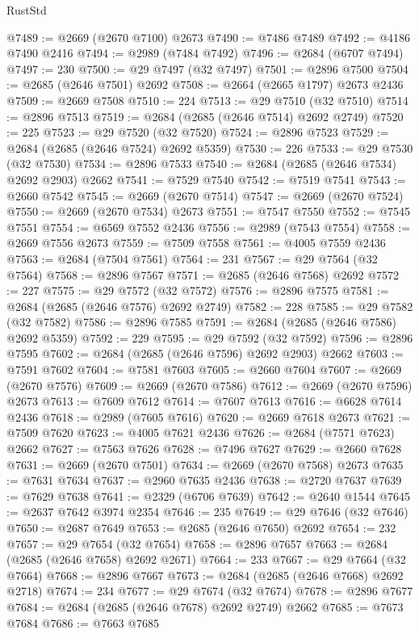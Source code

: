 \begin{lexlean}{RustStd}
\begin{coremodule}
@7489 := @2669 (@2670 @7100) @2673
@7490 := @7486 @7489
@7492 := @4186 @7490 @2416
@7494 := @2989 (@7484 @7492)
@7496 := @2684 (@6707 @7494)
@7497 := 230
@7500 := @29 @7497 (@32 @7497)
@7501 := @2896 @7500
@7504 := @2685 (@2646 @7501) @2692
@7508 := @2664 (@2665 @1797) @2673 @2436
@7509 := @2669 @7508
@7510 := 224
@7513 := @29 @7510 (@32 @7510)
@7514 := @2896 @7513
@7519 := @2684 (@2685 (@2646 @7514) @2692 @2749)
@7520 := 225
@7523 := @29 @7520 (@32 @7520)
@7524 := @2896 @7523
@7529 := @2684 (@2685 (@2646 @7524) @2692 @5359)
@7530 := 226
@7533 := @29 @7530 (@32 @7530)
@7534 := @2896 @7533
@7540 := @2684 (@2685 (@2646 @7534) @2692 @2903) @2662
@7541 := @7529 @7540
@7542 := @7519 @7541
@7543 := @2660 @7542
@7545 := @2669 (@2670 @7514)
@7547 := @2669 (@2670 @7524)
@7550 := @2669 (@2670 @7534) @2673
@7551 := @7547 @7550
@7552 := @7545 @7551
@7554 := @6569 @7552 @2436
@7556 := @2989 (@7543 @7554)
@7558 := @2669 @7556 @2673
@7559 := @7509 @7558
@7561 := @4005 @7559 @2436
@7563 := @2684 (@7504 @7561)
@7564 := 231
@7567 := @29 @7564 (@32 @7564)
@7568 := @2896 @7567
@7571 := @2685 (@2646 @7568) @2692
@7572 := 227
@7575 := @29 @7572 (@32 @7572)
@7576 := @2896 @7575
@7581 := @2684 (@2685 (@2646 @7576) @2692 @2749)
@7582 := 228
@7585 := @29 @7582 (@32 @7582)
@7586 := @2896 @7585
@7591 := @2684 (@2685 (@2646 @7586) @2692 @5359)
@7592 := 229
@7595 := @29 @7592 (@32 @7592)
@7596 := @2896 @7595
@7602 := @2684 (@2685 (@2646 @7596) @2692 @2903) @2662
@7603 := @7591 @7602
@7604 := @7581 @7603
@7605 := @2660 @7604
@7607 := @2669 (@2670 @7576)
@7609 := @2669 (@2670 @7586)
@7612 := @2669 (@2670 @7596) @2673
@7613 := @7609 @7612
@7614 := @7607 @7613
@7616 := @6628 @7614 @2436
@7618 := @2989 (@7605 @7616)
@7620 := @2669 @7618 @2673
@7621 := @7509 @7620
@7623 := @4005 @7621 @2436
@7626 := @2684 (@7571 @7623) @2662
@7627 := @7563 @7626
@7628 := @7496 @7627
@7629 := @2660 @7628
@7631 := @2669 (@2670 @7501)
@7634 := @2669 (@2670 @7568) @2673
@7635 := @7631 @7634
@7637 := @2960 @7635 @2436
@7638 := @2720 @7637
@7639 := @7629 @7638
@7641 := @2329 (@6706 @7639)
@7642 := @2640 @1544
@7645 := @2637 @7642 @3974 @2354
@7646 := 235
@7649 := @29 @7646 (@32 @7646)
@7650 := @2687 @7649
@7653 := @2685 (@2646 @7650) @2692
@7654 := 232
@7657 := @29 @7654 (@32 @7654)
@7658 := @2896 @7657
@7663 := @2684 (@2685 (@2646 @7658) @2692 @2671)
@7664 := 233
@7667 := @29 @7664 (@32 @7664)
@7668 := @2896 @7667
@7673 := @2684 (@2685 (@2646 @7668) @2692 @2718)
@7674 := 234
@7677 := @29 @7674 (@32 @7674)
@7678 := @2896 @7677
@7684 := @2684 (@2685 (@2646 @7678) @2692 @2749) @2662
@7685 := @7673 @7684
@7686 := @7663 @7685

\end{coremodule}
\end{lexlean}
